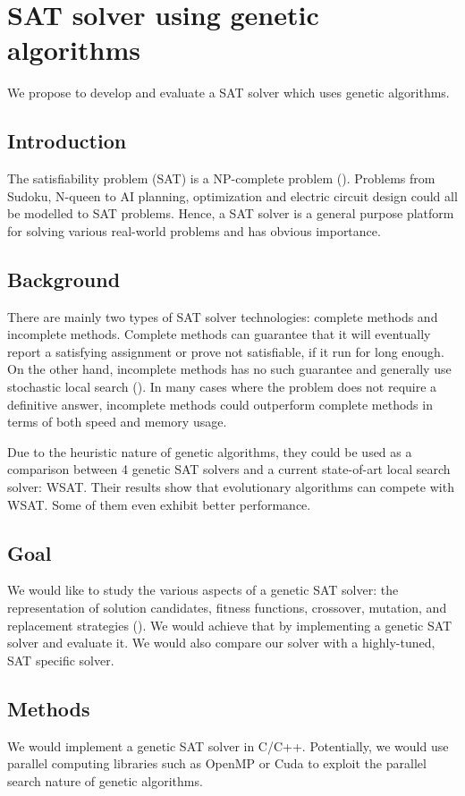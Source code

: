 \documentclass[../proposal.tex]{subfiles}
\begin{document}
\section{SAT solver using genetic algorithms}
We propose to develop and evaluate a SAT solver which uses genetic algorithms.

\subsection{Introduction}
The satisfiability problem (SAT) is a NP-complete problem
(\cite{cook_1971}). Problems from Sudoku, N-queen to AI planning,
optimization and electric circuit design could all be modelled to SAT problems.
Hence, a SAT solver is a general purpose platform for solving various
real-world problems and has obvious importance.

\subsection{Background}
There are mainly two types of SAT solver technologies: complete methods and
incomplete methods. Complete methods can guarantee that it will eventually
report a satisfying assignment or prove not satisfiable, if it run for long
enough. On the other hand, incomplete methods has no such guarantee and
generally use stochastic local search (\cite{gomes_kautz_sabharwal_selman_2008}). In many cases
where the problem does not require a definitive answer, incomplete methods
could outperform complete methods in terms of both speed and memory usage.

Due to the heuristic nature of genetic algorithms, they could be used as a
comparison between 4 genetic SAT solvers and a current state-of-art local
search solver: WSAT. Their results show that evolutionary algorithms can
compete with WSAT. Some of them even exhibit better performance.

\subsection{Goal}
We would like to study the various aspects of a genetic SAT solver: the
representation of solution candidates, fitness functions, crossover, mutation,
and replacement strategies (\cite{gottlieb_marchiori_rossi_2002}). We would achieve that by
implementing a genetic SAT solver and evaluate it. We would also compare our
solver with a highly-tuned, SAT specific solver.

\subsection{Methods}
We would implement a genetic SAT solver in C/C++. Potentially, we would use
parallel computing libraries such as OpenMP or Cuda to exploit the parallel
search nature of genetic algorithms.
\end{document}

